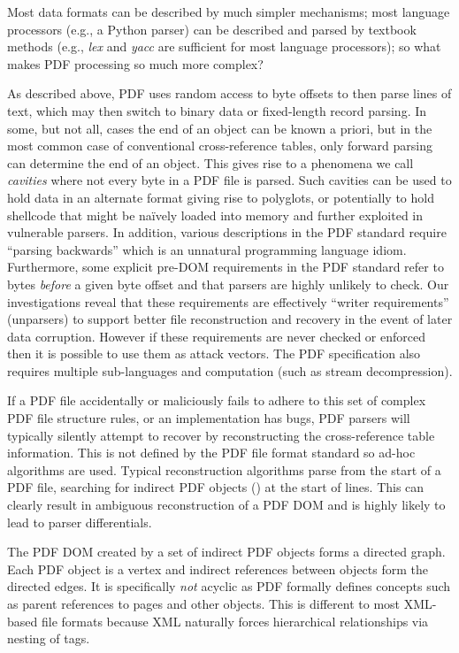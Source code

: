 Most data formats can be described by much simpler mechanisms;
most language processors (e.g., a Python parser) can be described and parsed by
textbook methods (e.g., \emph{lex} and \emph{yacc} are sufficient for
most language processors);
so what makes PDF processing so much more complex?

As described above, PDF uses random access to byte offsets to then parse lines of text,
which may then switch to binary data or fixed-length record parsing. 
In some, but not all, cases the end of an object can be known a priori, but in the most common case 
of conventional cross-reference tables, only forward parsing can determine the end of an object. 
This gives rise to a phenomena we call \emph{cavities} where not every byte in a PDF file is parsed.
Such cavities can be used to hold data in an alternate format giving rise to polyglots, or potentially
to hold shellcode that might be na\"ively loaded into memory and further exploited 
in vulnerable parsers.
In addition, various descriptions in the PDF standard require ``parsing backwards'' which is 
an unnatural programming language idiom. Furthermore, some explicit pre-DOM requirements
in the PDF standard
refer to bytes \emph{before} a given byte offset and that parsers are highly unlikely to check. 
Our investigations reveal that these requirements are effectively ``writer requirements'' (unparsers) to
support better file reconstruction and recovery in the event of later data corruption. 
However if these requirements are never checked or enforced then it is possible to use them as attack
vectors.  
The PDF specification also requires multiple
sub-languages and computation (such as stream decompression).

If a PDF file accidentally or maliciously fails to adhere to this set of complex PDF file structure
rules, or an implementation has bugs, PDF parsers will typically silently attempt to recover
by reconstructing the cross-reference table information. 
This is not defined by the PDF file format standard so 
ad-hoc algorithms are used. Typical reconstruction algorithms parse from the start of a PDF 
file, searching for indirect PDF objects () at the start of lines. This can clearly result
in ambiguous reconstruction of a PDF DOM and is highly likely to lead to parser differentials.

The PDF DOM created by a set of indirect PDF objects forms a directed graph. 
Each PDF object is a vertex and indirect references between objects form the directed edges. It is 
specifically \emph{not} acyclic as PDF formally defines concepts such as parent references to 
pages and other objects. This is different to most XML-based file formats because XML naturally 
forces hierarchical relationships via nesting of tags.

